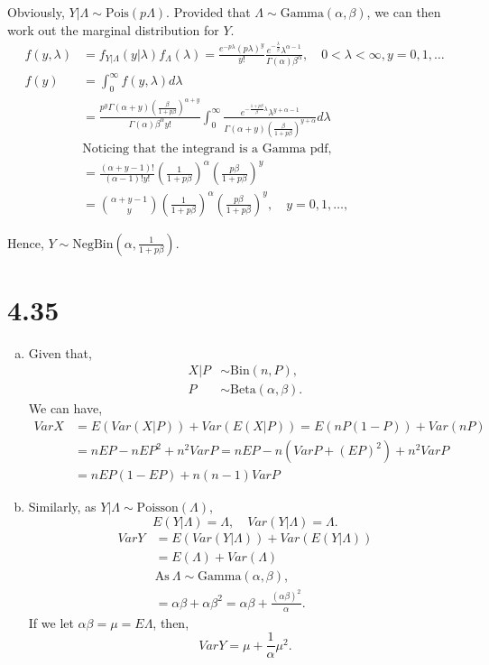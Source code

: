 \documentclass[letterpaper]{article}
\newcommand{\intzi}{\int_0^\infty}
\begin{document}
\begin{enumerate}[(a)]
        Obviously, $Y|\Lambda \sim \text{Pois}(p\Lambda)$. Provided that $\Lambda \sim \text{Gamma}(\alpha, \beta)$, we can then work out the marginal distribution for $Y$.
        \begin{align*}
        f(y, \lambda) & = f_{Y|\Lambda}(y|\lambda)f_\Lambda(\lambda) = \frac{e^{-p\lambda} (p\lambda)^y}{y!} \frac{e^{-\frac{\lambda}{\beta}} \lambda^{\alpha-1}}{\Gamma(\alpha)\beta^\alpha}, \quad 0 < \lambda < \infty, y = 0, 1, \dots \\
        f(y) & = \intzi f(y, \lambda) d\lambda \\
        & = \frac{p^y \Gamma(\alpha +y)\left(\frac{\beta}{1+p\beta}\right)^{\alpha+y}}{\Gamma(\alpha)\beta^\alpha y!} \intzi \frac{e^{-\frac{1+p\beta}{\beta} \lambda} \lambda^{y+\alpha-1}}{\Gamma(\alpha+y)\left(\frac{\beta}{1+p\beta}\right)^{y+\alpha}} d \lambda \\
        & \text{Noticing that the integrand is a Gamma pdf}, \\
        & = \frac{(\alpha+y-1)!}{(\alpha-1)!y!} \left(\frac{1}{1+p\beta}\right)^\alpha \left(\frac{p\beta}{1+p\beta}\right)^y \\
        & = \binom{\alpha+y-1}{y} \left(\frac{1}{1+p\beta}\right)^\alpha \left(\frac{p\beta}{1+p\beta}\right)^y, \quad y = 0, 1, \dots,
        \end{align*}
        
        Hence, $Y \sim \text{NegBin}(\alpha, \frac{1}{1+p\beta})$.
    \end{enumerate}
    \section*{4.35}
    \begin{enumerate}[(a)]
    	\item Given that,
    	\begin{align*}
    	X|P & \sim \text{Bin}(n, P), \\
    	P & \sim \text{Beta}(\alpha, \beta).
    	\end{align*}
    	We can have,
    	\begin{align*}
    	Var X & = E(Var(X|P)) + Var(E(X|P)) = E(nP(1-P)) + Var(nP) \\
    	& = nEP - nEP^2 + n^2 Var P = nEP - n(Var P + (EP)^2) + n^2 Var P \\
    	& = nEP(1-EP) + n(n-1) Var P
    	\end{align*}
    	\item Similarly, as $Y|\Lambda \sim \text{Poisson}(\Lambda)$, 
    	\[
    	E(Y|\Lambda) = \Lambda, \quad Var (Y|\Lambda) = \Lambda.
    	\]
    	\begin{align*}
    	Var Y & = E(Var(Y|\Lambda)) + Var(E(Y|\Lambda)) \\
    	& = E(\Lambda) + Var(\Lambda) \\
    	& \text{As}~ \Lambda \sim \text{Gamma}(\alpha, \beta), \\
    	& = \alpha\beta + \alpha \beta^2 = \alpha\beta + \frac{(\alpha\beta)^2}{\alpha}.
    	\end{align*}
    	If we let $\alpha\beta = \mu = E\Lambda$, then,
    	\[
    	Var Y = \mu + \frac{1}{\alpha} \mu^2.
    	\]
    \end{enumerate}
\end{document}
